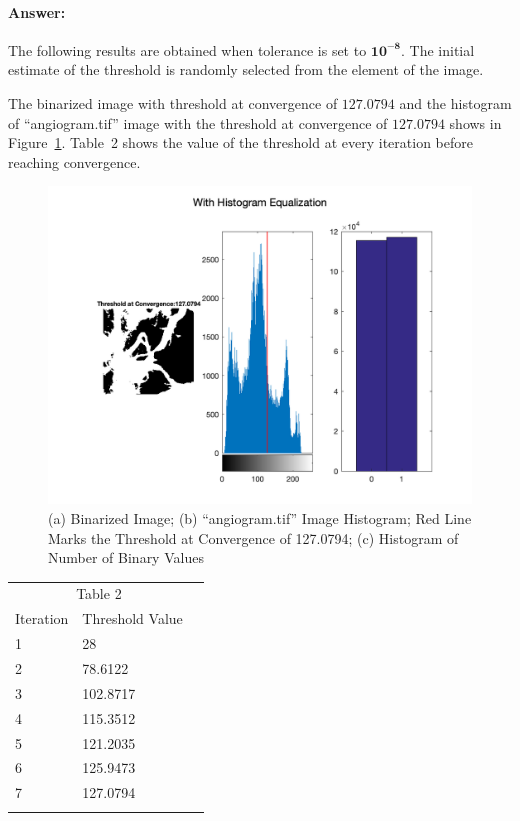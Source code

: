 \documentclass[12pt, letter]{article}
\begin{document}
\paragraph{Answer:} The following results are obtained when tolerance is set to $\mathbf{10^{-8}}$. The initial estimate of the threshold is randomly selected from the element of the image.  

The binarized image with threshold at convergence of $\mathbf{127.0794}$ and the histogram of ``angiogram.tif'' image with the threshold at convergence of $\mathbf{127.0794}$ shows in Figure~\ref{fig:q3-1}. Table~2 shows the value of the threshold at every iteration before reaching convergence.

\begin{figure}
    \centering
    \includegraphics[width=14cm]{with-histogram-equalization.png}
    \caption{(a) Binarized Image; (b) ``angiogram.tif'' Image Histogram; Red Line Marks the Threshold at Convergence of 127.0794; (c) Histogram of Number of Binary Values}
    \label{fig:q3-1}
\end{figure}

\begin{center}
\begin{tabular}{llr}  
\toprule
\multicolumn{2}{c}{Table 2} \\
\cmidrule(r){1-2}
Iteration   & Threshold Value \\
\midrule
1 & 28 \\
2 & 78.6122 \\
3 & 102.8717 \\
4 & 115.3512 \\
5 & 121.2035 \\
6 & 125.9473 \\
7 & 127.0794 \\

\bottomrule
\label{table:q2-2}
\end{tabular}    
\end{center}
\end{document}

